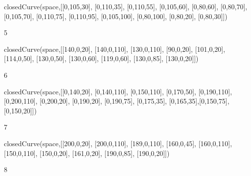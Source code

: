 \begin{xtc}
\begin{xtccomment}
\end{xtccomment}
\begin{spadsrc}
closedCurve(space,[[0,105,30], [0,110,35], [0,110,55], [0,105,60], [0,80,60], [0,80,70], [0,105,70], [0,110,75], [0,110,95], [0,105,100], [0,80,100], [0,80,20], [0,80,30]]) 
\end{spadsrc}
\begin{TeXOutput}
\begin{fricasmath}{6}
5%
\end{fricasmath}
\end{TeXOutput}
\end{xtc}
\begin{xtc}
\begin{xtccomment}
\end{xtccomment}
\begin{spadsrc}
closedCurve(space,[[140,0,20], [140,0,110], [130,0,110], [90,0,20], [101,0,20],[114,0,50], [130,0,50], [130,0,60], [119,0,60], [130,0,85], [130,0,20]]) 
\end{spadsrc}
\begin{TeXOutput}
\begin{fricasmath}{7}
6%
\end{fricasmath}
\end{TeXOutput}
\end{xtc}
\begin{xtc}
\begin{xtccomment}
\end{xtccomment}
\begin{spadsrc}
closedCurve(space,[[0,140,20], [0,140,110], [0,150,110], [0,170,50], [0,190,110], [0,200,110], [0,200,20], [0,190,20], [0,190,75], [0,175,35], [0,165,35],[0,150,75], [0,150,20]]) 
\end{spadsrc}
\begin{TeXOutput}
\begin{fricasmath}{8}
7%
\end{fricasmath}
\end{TeXOutput}
\end{xtc}
\begin{xtc}
\begin{xtccomment}
\end{xtccomment}
\begin{spadsrc}
closedCurve(space,[[200,0,20], [200,0,110], [189,0,110], [160,0,45], [160,0,110], [150,0,110], [150,0,20], [161,0,20], [190,0,85], [190,0,20]]) 
\end{spadsrc}
\begin{TeXOutput}
\begin{fricasmath}{9}
8%
\end{fricasmath}
\end{TeXOutput}
\end{xtc}
